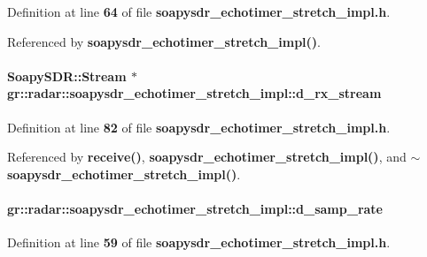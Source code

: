 Definition at line {\bf 64} of file {\bf soapysdr\+\_\+echotimer\+\_\+stretch\+\_\+impl.\+h}.



Referenced by {\bf soapysdr\+\_\+echotimer\+\_\+stretch\+\_\+impl()}.

\paragraph[{d\+\_\+rx\+\_\+stream}]{\setlength{\rightskip}{0pt plus 5cm}Soapy\+S\+D\+R\+::\+Stream $\ast$ gr\+::radar\+::soapysdr\+\_\+echotimer\+\_\+stretch\+\_\+impl\+::d\+\_\+rx\+\_\+stream\hspace{0.3cm}{\ttfamily [private]}}\label{classgr_1_1radar_1_1soapysdr__echotimer__stretch__impl_adfa7014ba8b46ce68c90dcd2db5ef708}


Definition at line {\bf 82} of file {\bf soapysdr\+\_\+echotimer\+\_\+stretch\+\_\+impl.\+h}.



Referenced by {\bf receive()}, {\bf soapysdr\+\_\+echotimer\+\_\+stretch\+\_\+impl()}, and {\bf $\sim$soapysdr\+\_\+echotimer\+\_\+stretch\+\_\+impl()}.

\paragraph[{d\+\_\+samp\+\_\+rate}]{ gr\+::radar\+::soapysdr\+\_\+echotimer\+\_\+stretch\+\_\+impl\+::d\+\_\+samp\+\_\+rate\hspace{0.3cm}{\ttfamily [private]}}\label{classgr_1_1radar_1_1soapysdr__echotimer__stretch__impl_ae667fccf7d4aa3ce87e09d49ed67434c}


Definition at line {\bf 59} of file {\bf soapysdr\+\_\+echotimer\+\_\+stretch\+\_\+impl.\+h}.



